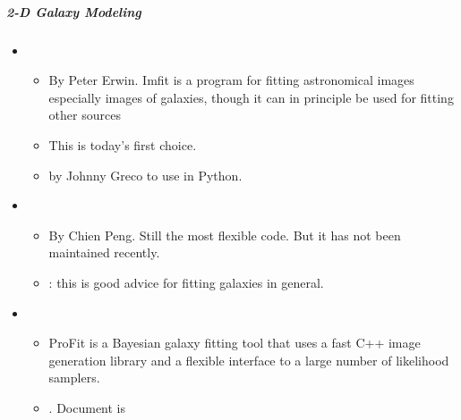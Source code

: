 \documentclass[letterpaper,10pt,english]{sphinxmanual}
\begin{document}
\subparagraph{2-D Galaxy Modeling}
\label{\detokenize{resource/astro/topics/photometry:d-galaxy-modeling}}\begin{itemize}
\item {} 
\begin{itemize}
\item {} 
By Peter Erwin. Imfit is a program for fitting astronomical images
\textendash{} especially images of galaxies, though it can in principle be
used for fitting other sources

\item {} 
This is today’s first choice.

\item {} 
 by Johnny Greco
to use  in Python.

\end{itemize}

\item {} 
\begin{itemize}
\item {} 
By Chien Peng. Still the most flexible code. But it has not been
maintained recently.

\item {} 
:
this is good advice for fitting galaxies in general.

\end{itemize}

\item {} 
\begin{itemize}
\item {} 
ProFit is a Bayesian galaxy fitting tool that uses a fast C++
image generation library and a flexible interface to a large
number of likelihood samplers.

\item {} 
. Document is


\end{itemize}
\end{itemize}
\end{document}
